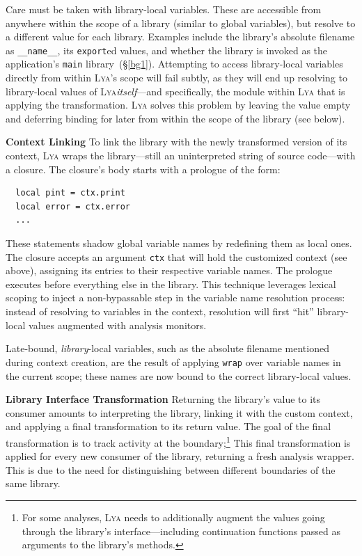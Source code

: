 \documentclass[letterpaper,twocolumn,10pt]{article}
\newcommand{\heading}[1]{\vspace{2pt}\noindent\textbf{#1}\enspace}
\newcommand{\ttt}[1]{\texttt{#1}}
\newcommand{\sx}[1]{(\S\ref{#1})}
\newcommand{\sys}{{\scshape Lya}\xspace}
\begin{document}
Care must be taken with library-local variables. %
These are accessible from anywhere within the scope of a library (similar to global variables), but resolve to a different value for each library.
Examples include the library's absolute filename as \ttt{\_\_name\_\_}, its \ttt{export}ed values, and whether the library is invoked as the application's \ttt{main} library~\sx{bg1}.
Attempting to access library-local variables directly from within \sys's scope will fail subtly, as they will end up resolving to library-local values of \sys \emph{itself}---and specifically, the module within \sys that is applying the transformation.
\sys solves this problem by leaving the value empty and deferring binding for later from within the scope of the library (see below).

\heading{Context Linking}
To link the library with the newly transformed version of its context, \sys wraps the library---still an uninterpreted string of source code---with a closure.
The closure's body starts with a prologue of the form:
\begin{verbatim}
  local pint = ctx.print
  local error = ctx.error
  ...
\end{verbatim}
These statements shadow global variable names by redefining them as local ones.
The closure accepts an argument \ttt{ctx} that will hold the customized context (see above), assigning its entries to their respective variable names.
The prologue executes before everything else in the library.
This technique leverages lexical scoping to inject a non-bypassable step in the variable name resolution process:
  instead of resolving to variables in the context, resolution will first ``hit'' library-local values augmented with analysis monitors.

Late-bound, \emph{library}-local variables, such as the absolute filename mentioned during context creation, are the result of applying \ttt{wrap} over variable names in the current scope;
  these names are now bound to the correct library-local values.

\heading{Library Interface Transformation}
Returning the library's value to its consumer amounts to interpreting the library, linking it with the custom context, and applying a final transformation to its return value.
The goal of the final transformation is to track activity at the boundary;\footnote{
  For some analyses, \sys needs to additionally augment the values going through the library's interface---including continuation functions passed as arguments to the library's methods.}
This final transformation is applied for every new consumer of the library, returning a fresh analysis wrapper.
This is due to the need for distinguishing between different boundaries of the same library.
\end{document}

